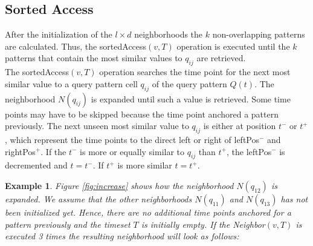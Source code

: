 \documentclass[abstracton,12pt,oneside]{scrreprt}
\newtheorem{example}{Example}
\begin{document}
\subsection{Sorted Access}
After the initialization of the $l \times d$ neighborhoods the $k$ non-overlapping patterns are calculated. Thus, the sortedAccess$(v, T)$ operation is executed until the $k$ patterns that contain the most similar values to $q_{ij}$ are retrieved.\\
The sortedAccess$(v, T)$ operation searches the time point for the next most similar value to a query pattern cell $q_{ij}$ of the query pattern $Q(t)$. The neighborhood $N(q_{ij})$ is expanded until such a value is retrieved. Some time points may have to be skipped because the time point anchored a pattern previously. The next unseen most similar value to $q_{ij}$ is either at position $t^-$ or $t^+$, which represent the time points to the direct left or right of leftPos$^-$ and rightPos$^+$. If the $t^-$ is more or equally similar to $q_{ij}$ than $t^+$, the leftPos$^-$ is decremented and $t=t^-$. If $t^+$ is more similar $t=t^+$.

\begin{example}
Figure \ref{fig:increase} shows how the neighborhood $N(q_{12})$ is expanded. We assume that the other neighborhoods $N(q_{11})$ and $N(q_{13})$ has not been initialized yet. 
Hence, there are no additional time points anchored for a pattern previously and the timeset $T$ is initially empty. If the Neighbor$(v,T)$ is executed 3 times the resulting neighborhood will look as follows:  
\end{example}
\end{document}
